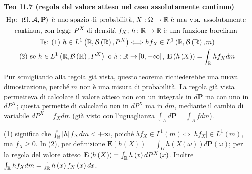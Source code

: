 \documentclass{article}
\begin{document}
\textbf{Teo 11.7 (regola del valore atteso nel caso assolutamente continuo)}%
\begin{gather*}
\text{Hp: }\left( \Omega ,\mathcal{A},\mathbf{P}\right) \text{ \`{e} uno
spazio di probabilit\`{a}, }X:\Omega \rightarrow 
\mathbb{R}
\text{ \`{e} una v.a. assolutamente } \\
\text{continua, con legge }P^{X}\text{ di densit\`{a} }f_{X}\text{; }h:%
\mathbb{R}
\rightarrow 
\mathbb{R}
\text{ \`{e} una funzione boreliana } \\
\text{Ts: (1) }h\in L^{1}\left( 
\mathbb{R}
,\mathcal{B}\left( 
\mathbb{R}
\right) ,P^{X}\right) \Longleftrightarrow hf_{X}\in L^{1}\left( 
\mathbb{R}
,\mathcal{B}\left( 
\mathbb{R}
\right) ,m\right) \\
\text{(2) se }h\in L^{1}\left( 
\mathbb{R}
,\mathcal{B}\left( 
\mathbb{R}
\right) ,P^{X}\right) \text{ o }h:%
\mathbb{R}
\rightarrow \left[ 0,+\infty \right] \text{, }\mathbf{E}\left( h\left(
X\right) \right) =\int_{%
\mathbb{R}
}hf_{X}dm
\end{gather*}

Pur somigliando alla regola gi\`{a} vista, questo teorema richiederebbe una
nuova dimostrazione, perch\'{e} $m$ non \`{e} una misura di probabilit\`{a}.
La regola gi\`{a} vista permetteva di calcolare il valore atteso non con un
integrale in $d\mathbf{P}$ ma con uno in $dP^{X}$; questa permette di
calcolarlo non in $dP^{X}$ ma in $dm$, mediante il cambio di variabile $%
dP^{X}=f_{X}dm$ (gi\`{a} visto con l'uguaglianza $\int_{A}d\mathbf{P}%
=\int_{A}fdm$).

(1) significa che $\int_{%
\mathbb{R}
}\left\vert h\right\vert f_{X}dm<+\infty $, poich\'{e} $hf_{X}\in
L^{1}\left( m\right) \Longleftrightarrow \left\vert hf_{X}\right\vert \in
L^{1}\left( m\right) $, ma $f_{X}\geq 0$. In (2), per definizione $\mathbf{E}%
\left( h\left( X\right) \right) =\int_{\Omega }h\left( X\left( \omega
\right) \right) d\mathbf{P}\left( \omega \right) $; per la regola del valore
atteso $\mathbf{E}\left( h\left( X\right) \right) =\int_{%
\mathbb{R}
}h\left( x\right) dP^{X}\left( x\right) $. Inoltre $\int_{%
\mathbb{R}
}hf_{X}dm=\int_{%
\mathbb{R}
}h\left( x\right) f_{X}\left( x\right) dx$.
\end{document}
